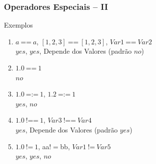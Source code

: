 \begin{frame}[fragile]

\frametitle{Operadores Especiais -- II}
    
	\begin{exampleblock}{Exemplos}
    	
    	\begin{enumerate}
    	
          \item $a\:$==$\:a$, \: $[1,2,3]\:$==$\:[1,2,3]$, \: $Var1\:$==$\:Var2$\\
          \pause
          $yes$, $yes$, Depende dos Valores (padrão $no$)
          \medskip
          \pause
          
          \item $1.0\:$==$\:1$\\
          \pause
          $no$
          \medskip
          \pause
          
          \item $1.0\:$=:=$\:1$, \: $1.2\:$=:=$\:1$\\
          \pause
          $yes$, $no$
          \medskip
          \pause

          \item $1.0\:$!==$\:1$, \: $Var3\:$!==$\:Var4$\\
          \pause
          $yes$, Depende dos Valores (padrão $yes$)
          \medskip
          \pause

          \item $1.0\:$!=$\:1$, \: aa\:$!=$\:bb, \: $Var1\:$!=$\:Var5$\\
          \pause
          $yes$, $yes$, $no$
          
        \end{enumerate}
	\end{exampleblock}


\end{frame}

